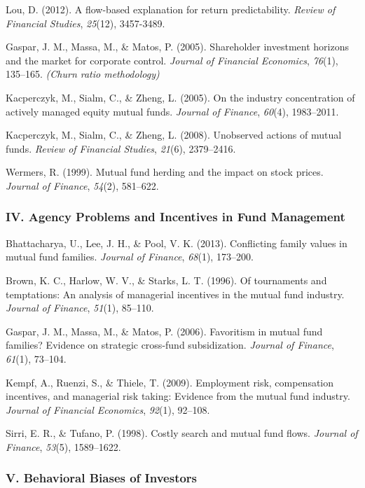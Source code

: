 \documentclass[
  12pt,
  letterpaper,
  DIV=11,
  numbers=noendperiod]{scrartcl}
\begin{document}
Lou, D. (2012). A flow-based explanation for return predictability.
\emph{Review of Financial Studies}, \emph{25}(12), 3457-3489.

Gaspar, J. M., Massa, M., \& Matos, P. (2005). Shareholder investment
horizons and the market for corporate control. \emph{Journal of
Financial Economics}, \emph{76}(1), 135--165. \emph{(Churn ratio
methodology)}

Kacperczyk, M., Sialm, C., \& Zheng, L. (2005). On the industry
concentration of actively managed equity mutual funds. \emph{Journal of
Finance}, \emph{60}(4), 1983--2011.

Kacperczyk, M., Sialm, C., \& Zheng, L. (2008). Unobserved actions of
mutual funds. \emph{Review of Financial Studies}, \emph{21}(6),
2379--2416.

Wermers, R. (1999). Mutual fund herding and the impact on stock prices.
\emph{Journal of Finance}, \emph{54}(2), 581--622.

\subsubsection{IV. Agency Problems and Incentives in Fund
Management}\label{iv.-agency-problems-and-incentives-in-fund-management}

Bhattacharya, U., Lee, J. H., \& Pool, V. K. (2013). Conflicting family
values in mutual fund families. \emph{Journal of Finance}, \emph{68}(1),
173--200.

Brown, K. C., Harlow, W. V., \& Starks, L. T. (1996). Of tournaments and
temptations: An analysis of managerial incentives in the mutual fund
industry. \emph{Journal of Finance}, \emph{51}(1), 85--110.

Gaspar, J. M., Massa, M., \& Matos, P. (2006). Favoritism in mutual fund
families? Evidence on strategic cross-fund subsidization. \emph{Journal
of Finance}, \emph{61}(1), 73--104.

Kempf, A., Ruenzi, S., \& Thiele, T. (2009). Employment risk,
compensation incentives, and managerial risk taking: Evidence from the
mutual fund industry. \emph{Journal of Financial Economics},
\emph{92}(1), 92--108.

Sirri, E. R., \& Tufano, P. (1998). Costly search and mutual fund flows.
\emph{Journal of Finance}, \emph{53}(5), 1589--1622.

\subsubsection{V. Behavioral Biases of
Investors}\label{v.-behavioral-biases-of-investors}
\end{document}
